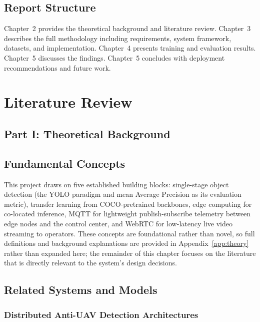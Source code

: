 \documentclass[12pt,a4paper]{report}
\begin{document}
\section{Report Structure}

Chapter~2 provides the theoretical background and literature review.
Chapter~3 describes the full methodology including requirements, system
framework, datasets, and implementation. Chapter~4 presents training and
evaluation results. Chapter~5 discusses the findings. Chapter~5 concludes
with deployment recommendations and future work.

\chapter{Literature Review}

\section*{Part I: Theoretical Background}

\section{Fundamental Concepts}

This project draws on five established building blocks: single-stage
object detection (the YOLO paradigm and mean Average Precision as its
evaluation metric), transfer learning from COCO-pretrained backbones,
edge computing for co-located inference, MQTT for lightweight
publish-subscribe telemetry between edge nodes and the control center,
and WebRTC for low-latency live video streaming to operators. These
concepts are foundational rather than novel, so full definitions and
background explanations are provided in Appendix~\ref{app:theory} rather
than expanded here; the remainder of this chapter focuses on the
literature that is directly relevant to the system's design decisions.

\section{Related Systems and Models}

\subsection{Distributed Anti-UAV Detection Architectures}
\end{document}

